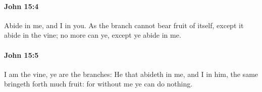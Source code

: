 		\paragraph{John 15:4} %
			\label{JOHN-15-4}

			Abide in me, and I in you. As the branch cannot bear fruit of itself, except it abide in the vine; no more can ye, except ye abide in me.

			\begin{framed}
				\scriptsize
				\begin{compactdesc}
					\item[SBLG] 
				\end{compactdesc}
			\end{framed}

		\paragraph{John 15:5} %
			\label{JOHN-15-5}

			I am the vine, ye are the branches: He that abideth in me, and I in him, the same bringeth forth much fruit: for without me ye can do nothing.

